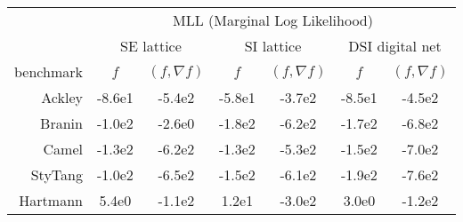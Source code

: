   \begin{tabular}{r|cccccc}
    & \multicolumn{6}{c}{MLL (Marginal Log Likelihood)} \\
    & \multicolumn{2}{c}{SE lattice} & \multicolumn{2}{c}{SI lattice} & \multicolumn{2}{c}{DSI digital net} \\
    benchmark & $f$ & $(f, \nabla f)$ & $f$ & $(f, \nabla f)$ & $f$ & $(f, \nabla f)$ \\
    \hline
        Ackley & -8.6e1 & -5.4e2 & -5.8e1 & -3.7e2 & -8.5e1 & -4.5e2 \\
        Branin & -1.0e2 & -2.6e0 & -1.8e2 & -6.2e2 & -1.7e2 & -6.8e2 \\
        Camel & -1.3e2 & -6.2e2 & -1.3e2 & -5.3e2 & -1.5e2 & -7.0e2 \\
        StyTang & -1.0e2 & -6.5e2 & -1.5e2 & -6.1e2 & -1.9e2 & -7.6e2 \\
        Hartmann & 5.4e0 & -1.1e2 & 1.2e1 & -3.0e2 & 3.0e0 & -1.2e2 \\
  \end{tabular}